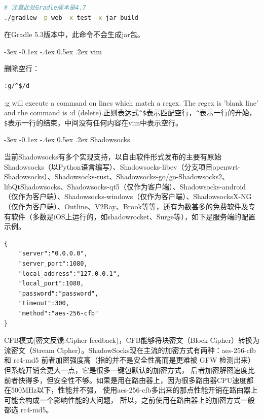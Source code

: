 \documentclass[8pt]{book}
\makeatletter
\numberwithin{dummy}{section}
\theoremstyle{ocrenumbox}
\theoremstyle{blacknumex}
\theoremstyle{blacknumbox}
\theoremstyle{ocrenum}
\renewcommand{\subsection}{\@startsection {subsection}{2}{\z@}
	{-3ex \@plus -0.1ex \@minus -.4ex}
	{0.5ex \@plus.2ex }
	{\normalfont\sffamily\bfseries}}
\makeatother
\begin{document}
\begin{lstlisting}[language=Bash]
# 注意此处Gradle版本是4.7
./gradlew -p web -x test -x jar build
\end{lstlisting}

在Gradle 5.3版本中，此命令不会生成jar包。

\subsection{vim}

删除空行：

\begin{lstlisting}[language=Bash]
:g/^$/d
\end{lstlisting}

:g will execute a command on lines which match a regex. The regex is 'blank line' and the command is :d (delete).正则表达式\verb|^$|表示匹配空行，\verb|^|表示一行的开始，\verb|$|表示一行的结束，中间没有任何内容在vim中表示空行。

\subsection{Shadowsocks}

当前Shadowsocks有多个实现支持，以自由软件形式发布的主要有原始Shadowsocks（以Python语言编写）、Shadowsocks-libev（分支项目openwrt-Shadowsocks）、Shadowsocks-rust、Shadowsocks-go/go-Shadowsocks2、libQtShadowsocks、Shadowsocks-qt5（仅作为客户端）、Shadowsocks-android（仅作为客户端）、Shadowsocks-windows（仅作为客户端）、ShadowsocksX-NG（仅作为客户端）、Outline、V2Ray、Brook等等，还有为数甚多的免费软件及专有软件（多数是iOS上运行的，如shadowrocket、Surge等），如下是服务端的配置示例。

\begin{lstlisting}
{
	"server":"0.0.0.0",
	"server_port":1080,
	"local_address":"127.0.0.1",
	"local_port":1080,
	"password":"password",
	"timeout":300,
	"method":"aes-256-cfb"
}
\end{lstlisting}

CFB模式(密文反馈:Cipher feedback)，CFB能够将块密文（Block Cipher）转换为流密文（Stream Cipher）。ShadowSocks现在主流的加密方式有两种：aes-256-cfb 和 rc4-md5 前者加密强度高（指的并不是安全性高而是更难被 GFW 检测出来）
但系统开销会更大一点，它是很多一键包默认的加密方式，
后者加密解密速度比前者快得多，但安全性不够。如果是用在路由器上，因为很多路由器CPU速度都在500MHz以下，性能并不强，
使用aes-256-cfb多出来的那点性能开销在路由器上可能会构成一个影响性能的大问题，
所以，之前使用在路由器上的加密方式一般都选 rc4-md5。
\end{document}
